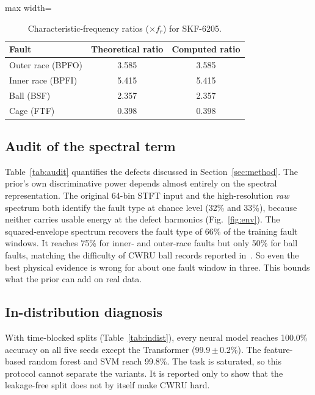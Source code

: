\documentclass[conference]{IEEEtran}
\begin{document}
\begin{table}[t]
\caption{Characteristic-frequency ratios ($\times f_r$) for SKF-6205.}
\label{tab:freq}
\centering
\footnotesize
\begin{adjustbox}{max width=\columnwidth}
\begin{tabular}{lcc}
\toprule
Fault & Theoretical ratio & Computed ratio \\
\midrule
Outer race (BPFO) & 3.585 & 3.585 \\
Inner race (BPFI) & 5.415 & 5.415 \\
Ball (BSF)        & 2.357 & 2.357 \\
Cage (FTF)        & 0.398 & 0.398 \\
\bottomrule
\end{tabular}
\end{adjustbox}
\end{table}

\subsection{Audit of the spectral term}
Table~\ref{tab:audit} quantifies the defects discussed in Section~\ref{sec:method}.
The prior's own discriminative power depends almost entirely on the spectral
representation. The original 64-bin STFT input and the high-resolution
\emph{raw} spectrum both identify the fault type at chance level (32\% and
33\%), because neither carries usable energy at the defect harmonics
(Fig.~\ref{fig:env}). The squared-envelope spectrum recovers the fault type of
66\% of the training fault windows. It reaches 75\% for inner- and outer-race
faults but only 50\% for ball faults, matching the difficulty of CWRU ball
records reported in~\cite{smith2015}. So even the best physical evidence is
wrong for about one fault window in three. This bounds what the prior can add
on real data.



\subsection{In-distribution diagnosis}
With time-blocked splits (Table~\ref{tab:indist}), every neural model reaches
100.0\% accuracy on all five seeds except the Transformer
(99.9\,$\pm$\,0.2\%). The feature-based random forest and SVM reach 99.8\%. The
task is saturated, so this protocol cannot separate the variants. It is
reported only to show that the leakage-free split does not by itself make CWRU
hard.
\end{document}
